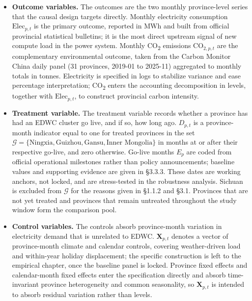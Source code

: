 \documentclass[12pt,a4paper]{article}
\begin{document}
\begin{itemize}
  \item \textbf{Outcome variables.} The outcomes are the two monthly
        province-level series that the causal design targets directly.
        Monthly electricity consumption $\text{Elec}_{p,t}$ is the
        primary outcome, reported in MWh and built from official
        provincial statistical bulletins; it is the most direct
        upstream signal of new compute load in the power system.
        Monthly CO\textsubscript{2} emissions $\text{CO}_{2,p,t}$ are
        the complementary environmental outcome, taken from the
        Carbon Monitor China daily panel (31 provinces, 2019-01 to
        2025-11) aggregated to monthly totals in tonnes. Electricity
        is specified in logs to stabilize variance and ease
        percentage interpretation; CO\textsubscript{2} enters the
        accounting decomposition in levels, together with
        $\text{Elec}_{p,t}$, to construct provincial carbon intensity.

  \item \textbf{Treatment variable.} The treatment variable records
        whether a province has had an EDWC cluster go live, and if
        so, how long ago. $D_{p,t}$ is a province-month indicator
        equal to one for treated provinces in the set
        $\mathcal{G} = \{\text{Ningxia}, \text{Guizhou}, \text{Gansu},
        \text{Inner Mongolia}\}$ in months at or after their
        respective go-live, and zero otherwise. Go-live months $E_p$
        are coded from official operational milestones rather than
        policy announcements; baseline values and supporting
        evidence are given in \S3.3.3. These dates are working
        anchors, not locked, and are stress-tested in the robustness
        analysis. Sichuan is excluded from $\mathcal{G}$ for the
        reasons given in \S1.1.2 and \S3.1. Provinces that are not
        yet treated and provinces that remain untreated throughout the
        study window form the comparison pool.

  \item \textbf{Control variables.} The controls absorb province-month
        variation in electricity demand that is unrelated to EDWC.
        $\mathbf{X}_{p,t}$ denotes a vector of province-month climate
        and calendar controls, covering weather-driven load and
        within-year holiday displacement; the specific construction
        is left to the empirical chapter, once the baseline panel is
        locked. Province fixed effects and calendar-month fixed
        effects enter the specification directly and absorb
        time-invariant province heterogeneity and common seasonality,
        so $\mathbf{X}_{p,t}$ is intended to absorb residual
        variation rather than levels.


\end{itemize}
\end{document}
